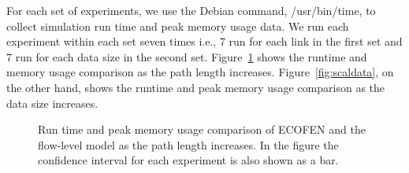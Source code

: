For each set of experiments, we use the Debian command, /usr/bin/time, to collect simulation run time and peak memory usage data. We run each experiment within each set seven times i.e., 7 run for each link in the first set and 7 run for each data size in the second set. Figure~\ref{fig:scallinks} shows the runtime and memory usage comparison as the path length increases. Figure~\ref{fig:scaldata}, on the other hand, shows the runtime and peak memory usage comparison as the data size increases.

\begin{figure}[ht]
	\centering
	\centering
	\caption{Run time and peak memory usage comparison of ECOFEN and the flow-level model as the path length increases. In the figure the confidence interval for each experiment is also shown as a bar.}
	\label{fig:scallinks}
\end{figure}

